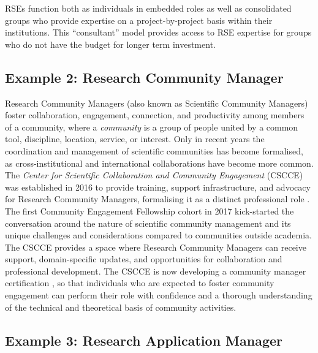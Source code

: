 \documentclass[authordate,meta,issue]{jote-new-article}
\begin{document}
RSEs function both as individuals in embedded roles as well as consolidated groups who provide expertise on a project-by-project basis within their institutions. This “consultant” model provides access to RSE expertise for groups who do not have the budget for longer term investment.



\subsection{Example 2: Research Community Manager}



Research Community Managers (also known as Scientific Community Managers) foster collaboration, engagement, connection, and productivity among members of a community, where a \emph{community }is a group of people united by a common tool, discipline, location, service, or interest. Only in recent years the coordination and management of scientific communities has become formalised, as cross-institutional and international collaborations have become more common. The \emph{Center for Scientific Collaboration and Community Engagement} (CSCCE) was established in 2016 to provide training, support infrastructure, and advocacy for Research Community Managers, formalising it as a distinct professional role \parencites{CSCCE2022}. The first Community Engagement Fellowship cohort in 2017 kick-started the conversation around the nature of scientific community management and its unique challenges and considerations compared to communities outside academia. The CSCCE provides a space where Research Community Managers can receive support, domain-specific updates, and opportunities for collaboration and professional development. The CSCCE is now developing a community manager certification \parencites{CSCCE2022a}, so that individuals who are expected to foster community engagement can perform their role with confidence and a thorough understanding of the technical and theoretical basis of community activities.



\subsection{Example 3: Research Application Manager}
\end{document}
